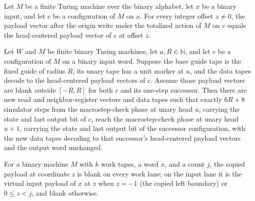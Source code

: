 \begin{lemma}
\label{Complexity.sourceWrittenPayload_away}
\leanok
{}
Let $M$ be a finite Turing machine over the binary alphabet, let $x$ be a binary input,
and let $c$ be a configuration of $M$ on $x$. For every integer offset $z \ne 0$, the
payload vector after the origin write under the totalized action of $M$ on $c$ equals
the head-centered payload vector of $c$ at offset $z$.
\end{lemma}

\begin{lemma}
\label{Complexity.dataCfg_simulates}
\leanok
{}
Let $W$ and $M$ be finite binary Turing machines, let $a,R\in\mathbb{N}$, and let $c$ be
a configuration of $M$ on a binary input word. Suppose the base guide tape is the fixed
guide of radius $R$, its unary tape has a unit marker at $u$, and the data tapes decode
to the head-centered payload vectors of $c$. Assume those payload vectors are blank
outside $[-R,R]$ for both $c$ and its one-step successor. Then there are new read and
neighbor-register vectors and data tapes such that exactly $6R+8$ simulator steps from
the macrostep-check phase at unary head $u$, carrying the state and last output bit of
$c$, reach the macrostep-check phase at unary head $u+1$, carrying the state and last
output bit of the successor configuration, with the new data tapes decoding to that
successor's head-centered payload vectors and the output word unchanged.
\end{lemma}

\begin{definition}
\label{Complexity.copiedPayload}
\leanok
{}
For a binary machine $M$ with $k$ work tapes, a word $x$, and a count $j$, the
copied payload at coordinate $z$ is blank on every work lane; on the input lane
it is the virtual input payload of $x$ at $z$ when $z = -1$ (the copied left
boundary) or $0 \le z < j$, and blank otherwise.
\end{definition}


